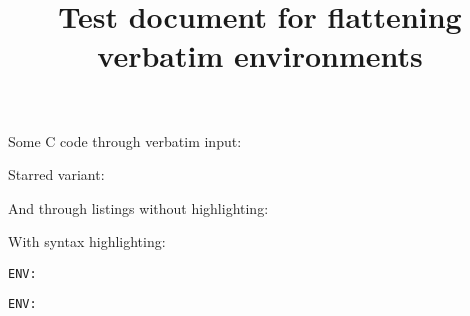 \documentclass{article}
\title{Test document for flattening verbatim environments}
\begin{document}
\noindent Some C code through verbatim input:

\noindent Starred variant:



\noindent And through listings without highlighting:


\noindent With syntax highlighting:


\verb||

\lstinline||

\begin{verbatim}
ENV: 
\end{verbatim}

\begin{lstlisting}[language=tex]
ENV: 
\end{lstlisting}
\end{document}
